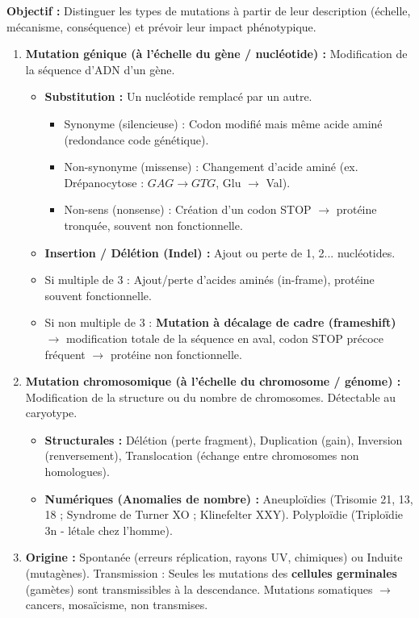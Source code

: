 \documentclass[11pt]{article}
\begin{document}
\begin{methode}
    \textbf{Objectif :} Distinguer les types de mutations à partir de leur description (échelle, mécanisme, conséquence) et prévoir leur impact phénotypique.
    \begin{enumerate}
        \item \textbf{Mutation génique (à l'échelle du gène / nucléotide) :} Modification de la séquence d'ADN d'un gène.
            \begin{itemize}
                \item \textbf{Substitution :} Un nucléotide remplacé par un autre.
                    \begin{itemize}
                        \item Synonyme (silencieuse) : Codon modifié mais même acide aminé (redondance code génétique).
                        \item Non-synonyme (missense) : Changement d'acide aminé (ex. Drépanocytose : $GAG \to GTG$, Glu $\to$ Val).
                        \item Non-sens (nonsense) : Création d'un codon STOP $\to$ protéine tronquée, souvent non fonctionnelle.
                    \end{itemize}
                \item \textbf{Insertion / Délétion (Indel) :} Ajout ou perte de 1, 2... nucléotides.
                    \item Si multiple de 3 : Ajout/perte d'acides aminés (in-frame), protéine souvent fonctionnelle.
                    \item Si non multiple de 3 : \textbf{Mutation à décalage de cadre (frameshift)} $\to$ modification totale de la séquence en aval, codon STOP précoce fréquent $\to$ protéine non fonctionnelle.
            \end{itemize}
        \item \textbf{Mutation chromosomique (à l'échelle du chromosome / génome) :} Modification de la structure ou du nombre de chromosomes. Détectable au caryotype.
            \begin{itemize}
                \item \textbf{Structurales :} Délétion (perte fragment), Duplication (gain), Inversion (renversement), Translocation (échange entre chromosomes non homologues).
                \item \textbf{Numériques (Anomalies de nombre) :} Aneuploïdies (Trisomie 21, 13, 18 ; Syndrome de Turner XO ; Klinefelter XXY). Polyploïdie (Triploïdie 3n - létale chez l'homme).
            \end{itemize}
        \item \textbf{Origine :} Spontanée (erreurs réplication, rayons UV, chimiques) ou Induite (mutagènes). Transmission : Seules les mutations des \textbf{cellules germinales} (gamètes) sont transmissibles à la descendance. Mutations somatiques $\to$ cancers, mosaïcisme, non transmises.
    \end{enumerate}
\end{methode}
\end{document}
